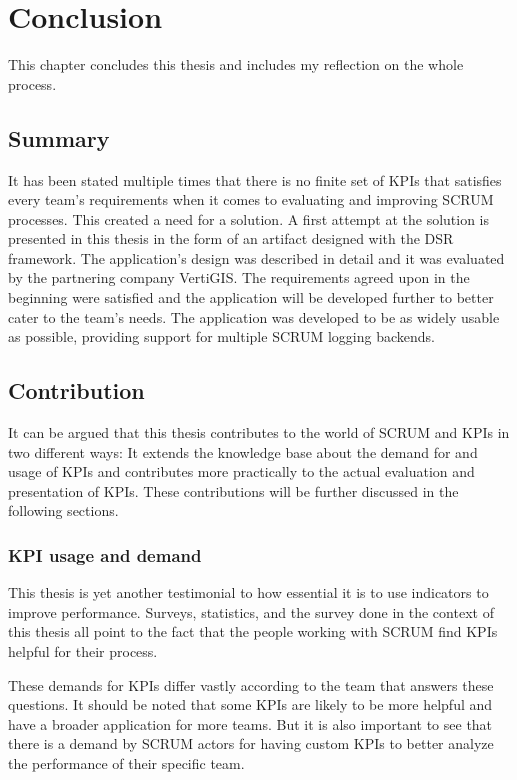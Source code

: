 
\chapter{Conclusion} 
\label{Chapter7} 

This chapter concludes this thesis and includes my reflection on the whole process.

\section{Summary}

It has been stated multiple times that there is no finite
set of KPIs that satisfies every team's requirements when it comes to evaluating and improving SCRUM processes.
This created a need for a solution.
A first attempt at the solution is presented in this thesis in the form of an artifact designed with the DSR framework.
The application's design was described in detail and it was evaluated by the partnering company VertiGIS.
The requirements agreed upon in the beginning were satisfied and the application will be developed further to better cater to the team's needs.
The application was developed to be as widely usable as possible, providing support for multiple SCRUM logging backends.


\section{Contribution}

It can be argued that this thesis contributes to the world of SCRUM and KPIs in two different ways: 
It extends the knowledge base about the demand for and usage of KPIs and contributes more practically to the actual evaluation and presentation of KPIs. 
These contributions will be further discussed in the following sections. 

\subsection{KPI usage and demand}

This thesis is yet another testimonial to how essential it is to use indicators to improve performance. 
Surveys, statistics, and the survey done in the context of this thesis all point to the fact that the people working with SCRUM find KPIs helpful for their process. 

These demands for KPIs differ vastly according to the team that answers these questions. 
It should be noted that some KPIs are likely to be more helpful and have a broader application for more teams. 
But it is also important to see that there is a demand by SCRUM actors for having custom KPIs to better analyze the performance of their specific team. 


